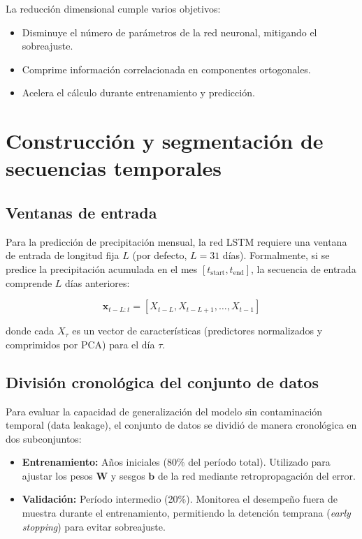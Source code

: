 La reducción dimensional cumple varios objetivos:
\begin{itemize}
    \item Disminuye el número de parámetros de la red neuronal, mitigando el sobreajuste.
    \item Comprime información correlacionada en componentes ortogonales.
    \item Acelera el cálculo durante entrenamiento y predicción.
\end{itemize}

\section{Construcción y segmentación de secuencias temporales}
\label{sec:secuencias_temporales}

\subsection{Ventanas de entrada}
Para la predicción de precipitación mensual, la red LSTM requiere una ventana de entrada de longitud fija $L$ (por defecto, $L = 31$ días). Formalmente, si se predice la precipitación acumulada en el mes $[t_{\text{start}}, t_{\text{end}}]$, la secuencia de entrada comprende $L$ días anteriores:

\begin{equation}
    \mathbf{x}_{t-L:t} = [X_{t-L}, X_{t-L+1}, \ldots, X_{t-1}]
\end{equation}

donde cada $X_{\tau}$ es un vector de características (predictores normalizados y comprimidos por PCA) para el día $\tau$.

\subsection{División cronológica del conjunto de datos}
Para evaluar la capacidad de generalización del modelo sin contaminación temporal (data leakage), el conjunto de datos se dividió de manera cronológica en dos subconjuntos:

\begin{itemize}
    \item \textbf{Entrenamiento:} Años iniciales (80\% del período total). Utilizado para ajustar los pesos $\mathbf{W}$ y sesgos $\mathbf{b}$ de la red mediante retropropagación del error.
    \item \textbf{Validación:} Período intermedio (20\%). Monitorea el desempeño fuera de muestra durante el entrenamiento, permitiendo la detención temprana (\textit{early stopping}) para evitar sobreajuste.
\end{itemize}

